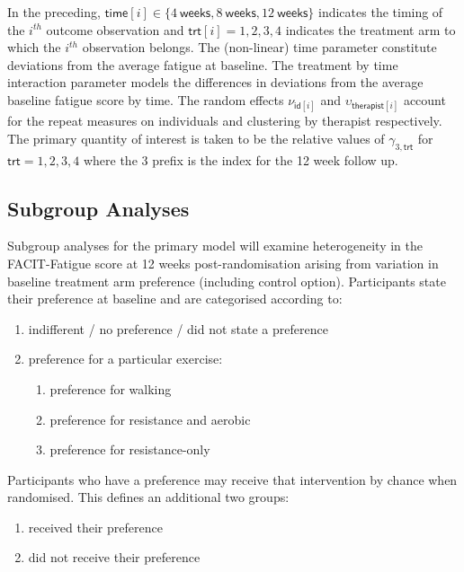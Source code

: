 \documentclass[
]{article}
\begin{document}
In the preceding, $\mathsf{time}[i] \in \{4 \mathsf{\ weeks}, 8 \mathsf{\ weeks}, 12 \mathsf{\ weeks}\}$ indicates the timing of the $i^{th}$ outcome observation and $\mathsf{trt}[i] = 1, 2, 3, 4$ indicates the treatment arm to which the $i^{th}$ observation belongs.
The (non-linear) time parameter constitute deviations from the average fatigue at baseline.
The treatment by time interaction parameter models the differences in deviations from the average baseline fatigue score by time.
The random effects $\nu_{\mathsf{id}[i]}$ and $\upsilon_{\mathsf{therapist}[i]}$ account for the repeat measures on individuals and clustering by therapist respectively.
The primary quantity of interest is taken to be the relative values of $\gamma_{3,\mathsf{trt}}$ for $\mathsf{trt} = 1, 2, 3, 4$ where the 3 prefix is the index for the 12 week follow up.

\hypertarget{subgroup-analyses}{%
\subsection{Subgroup Analyses}\label{subgroup-analyses}}

Subgroup analyses for the primary model will examine heterogeneity in the FACIT-Fatigue score at 12 weeks post-randomisation arising from variation in baseline treatment arm preference (including control option).
Participants state their preference at baseline and are categorised according to:

\begin{enumerate}
    \item indifferent / no preference / did not state a preference
    \item preference for a particular exercise:
    \begin{enumerate}
        \item preference for walking
        \item preference for resistance and aerobic
        \item preference for resistance-only
    \end{enumerate}
\end{enumerate}

Participants who have a preference may receive that intervention by chance when randomised.
This defines an additional two groups:
\begin{enumerate}
    \item received their preference
    \item did not receive their preference
\end{enumerate}
\end{document}
